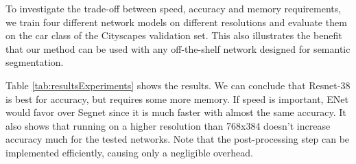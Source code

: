 \documentclass[10pt,twocolumn,letterpaper]{article}
\begin{document}
\begin{table}[t]
	\begin{center}
	\end{center}
	\caption{Average Precision (AP), AP using gt 
segmentation labels (AP\textsubscript{gt}), speed of forward pass (fps), number 
of parameters () and memory usage (GB) for different models 
evaluated on the car class of the Cityscapes validation set.}
	\label{tab:resultsExperiments}
\end{table}

To investigate the trade-off between speed, accuracy and memory requirements, 
we train four different network models on different resolutions and evaluate them 
on the car class of the Cityscapes validation set. This also illustrates the 
benefit that our method can be used with any off-the-shelf network designed for 
semantic segmentation.

Table \ref{tab:resultsExperiments} shows the results. We can conclude 
that Resnet-38 is best for accuracy, but requires some more memory. 
If speed is important, ENet would favor over Segnet since it is much faster with 
almost the same accuracy. It also shows that running on a higher resolution 
than 768x384 doesn't increase accuracy much for the tested networks. Note that the post-processing step can be implemented efficiently, causing only a negligible overhead. 
\end{document}
